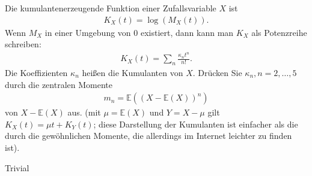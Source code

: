 \begin{exercise}
Die kumulantenerzeugende Funktion einer Zufallsvariable $X$ ist
\begin{align*}
  K_X(t) = \log(M_X(t)).
\end{align*}
Wenn $M_X$ in einer Umgebung von 0 existiert, dann kann man $K_X$ als Potenzreihe schreiben:
\begin{align*}
  K_X(t) = \sum_n\frac{\kappa_nt^n}{n!}.
\end{align*}
Die Koeffizienten $\kappa_n$ heißen die Kumulanten von $X$. Drücken Sie $\kappa_n,
n = 2,\dots,5$ durch die zentralen Momente
\begin{align*}
  m_n = \mathbb{E}((X-\mathbb{E}(X))^n)
\end{align*}
von $X - \mathbb{E}(X)$ aus. (mit $\mu = \mathbb{E}(X)$ und $Y = X - \mu$ gilt
$K_X(t) = \mu t + K_Y(t)$; diese Darstellung der Kumulanten ist einfacher als die
durch die gewöhnlichen Momente, die allerdings im Internet leichter zu finden ist).
\end{exercise}
\begin{solution}

Trivial

\end{solution}
